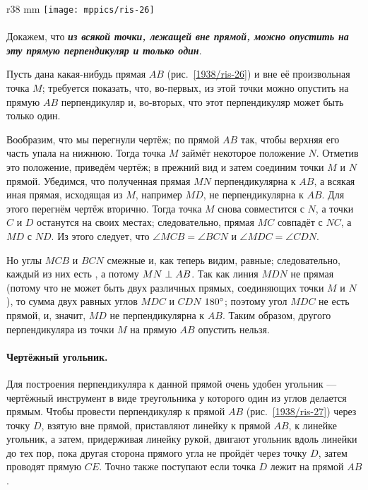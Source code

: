 \begin{wrapfigure}{r}{38 mm}
\centering
\texttt{[image: mppics/ris-26]}
\caption{}\label{1938/ris-26}
\end{wrapfigure}

\paragraph{}\label{1938/24}
Докажем, что \textbf{\emph{из всякой точки, лежащей вне прямой, можно опустить на эту прямую перпендикуляр и только один}}.

Пусть дана какая-нибудь прямая $AB$ (рис.~\ref{1938/ris-26}) и вне её произвольная точка $M$;
требуется показать, что, во-первых, из этой точки можно опустить на прямую $AB$ перпендикуляр и, во-вторых, что этот перпендикуляр может быть только один.

Вообразим, что мы перегнули чертёж;
по прямой $AB$ так, чтобы верхняя его часть упала на нижнюю.
Тогда точка $M$ займёт некоторое положение $N$.
Отметив это положение, приведём чертёж;
в прежний вид и затем соединим точки $M$ и $N$ прямой.
Убедимся, что полученная прямая $MN$ перпендикулярна к $AB$, а всякая иная прямая, исходящая из $M$, например $MD$, не перпендикулярна к $AB$.
Для этого перегнём чертёж вторично.
Тогда точка $M$ снова совместится с $N$, а точки $C$ и $D$ останутся на своих местах;
следовательно, прямая $MC$ совпадёт с $NC$, а $MD$ с $ND$.
Из этого следует, что $\angle MCB = \angle BCN$ и $\angle MDC = \angle CDN$.

Но углы $MCB$ и $BCN$ смежные и, как теперь видим, равные;
следовательно, каждый из них есть , а потому $MN\z\perp AB$.
Так как линия $MDN$ не прямая (потому что не может быть двух различных прямых, соединяющих точки $M$ и $N$), то сумма двух равных углов $MDC$ и $CDN$  $180\degree$;
поэтому угол $MDC$ не есть прямой, и, значит, $MD$ не перпендикулярна к $AB$.
Таким образом, другого перпендикуляра из точки $M$ на прямую $AB$ опустить нельзя.


\paragraph{Чертёжный угольник.}\label{1938/25} 
Для построения перпендикуляра к данной прямой очень удобен угольник — чертёжный инструмент в виде треугольника у которого один из углов делается прямым.
Чтобы провести перпендикуляр к прямой $AB$ (рис.~\ref{1938/ris-27}) через точку $D$, взятую вне прямой, приставляют линейку к прямой $AB$, к линейке угольник, а затем, придерживая линейку рукой, двигают угольник вдоль линейки до тех пор, пока другая сторона прямого угла не пройдёт через точку $D$, затем проводят прямую $CE$.
Точно также поступают если точка $D$ лежит на прямой $AB$.


